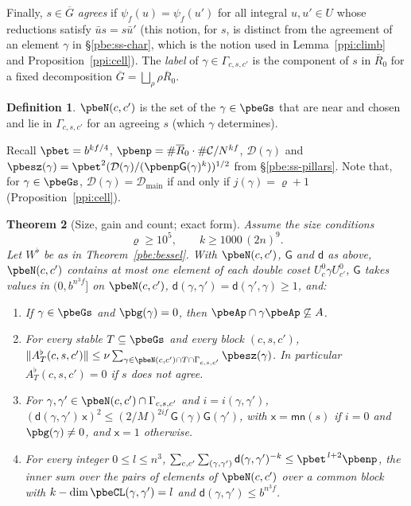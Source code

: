 \documentclass[10pt]{amsart}
\newtheorem{theorem}{Theorem}[section]
\theoremstyle{definition}
\newtheorem{definition}[theorem]{Definition}
\theoremstyle{remark}
\providecommand{\auG}{\overline G}
\providecommand{\pbDmain}{\mathcal D_{\mathrm{main}}}
\providecommand{\pbR}{\overline R_0}
\begin{document}
Finally, $s\in\auG$ \emph{agrees} if $\psi_f(u)=\psi_f(u')$ for all integral $u,u'\in U$ whose
reductions satisfy $\bar us=s\bar u'$ (this notion, for $s$, is distinct from the agreement of an element $\gamma$ in \S\ref{pbe:ss-char}, which is the notion used in Lemma~\ref{ppi:climb} and Proposition~\ref{ppi:cell}). The \emph{label} of $\gamma\in\Gamma_{c,s,c'}$ is the component of $s$
in $\pbR$ for a fixed decomposition $\auG=\bigsqcup_\rho\rho\pbR$.

\begin{definition}\label{ppi:def-N}
$\pbeN(c,c')$ is the set of the $\gamma\in\pbeGs$ that are near and chosen and lie in
$\Gamma_{c,s,c'}$ for an agreeing $s$ (which $\gamma$ determines).
\end{definition}

Recall $\pbet=b^{kf/4}$, $\pbenp=\#\pbR\cdot\#\mathcal C/N^{kf}$, $\mathcal D(\gamma)$ and
$\pbesz(\gamma)=\pbet^2(\mathcal D(\gamma)/(\pbenp\mathsf G(\gamma)^k))^{1/2}$ from
\S\ref{pbe:ss-pillars}. Note that, for $\gamma\in\pbeGs$, $\mathcal D(\gamma)=\pbDmain$ if and only if $j(\gamma)=\varrho+1$ (Proposition~\ref{ppi:cell}).

\begin{theorem}[Size, gain and count; exact form]\label{ppi:pillars}
Assume the size conditions
\begin{equation}\label{ppi:eq-sizes}
\varrho\ge10^5,\qquad k\ge1000\,(2n)^9 .
\end{equation}
Let $W^\flat$ be as in Theorem~\ref{pbe:bessel}. With $\pbeN(c,c')$, $\mathsf G$ and $\mathsf d$ as
above, $\pbeN(c,c')$ contains at most one element of each double coset $U_c^0\gamma U_{c'}^0$,
$\mathsf G$ takes values in $(0,b^{n^3f}]$ on $\pbeN(c,c')$, $\mathsf d(\gamma,\gamma')=\mathsf d(\gamma',
\gamma)\ge1$, and:
\begin{enumerate}
\item[(R)] If $\gamma\in\pbeGs$ and $\pbg(\gamma)=0$, then $\pbeAp\cap\gamma\pbeAp\not\subseteq A$.
\item[(S)] For every stable $T\subseteq\pbeGs$ and every block $(c,s,c')$, $\|A^\flat_T(c,s,c')\|\le
\nu\sum_{\gamma\in\pbeN(c,c')\cap T\cap\Gamma_{c,s,c'}}\pbesz(\gamma)$. In particular $A^\flat_T(c,s,
c')=0$ if $s$ does not agree.
\item[(G)] For $\gamma,\gamma'\in\pbeN(c,c')\cap\Gamma_{c,s,c'}$ and $i=i(\gamma,\gamma')$,
$(\mathsf d(\gamma,\gamma')\,\mathsf x)^2\le(2/M)^{2if}\,\mathsf G(\gamma)\mathsf G(\gamma')$, with
$\mathsf x=\mathsf{mn}(s)$ if $i=0$ and $\pbg(\gamma)\ne0$, and $\mathsf x=1$ otherwise.
\item[(C)] For every integer $0\le l\le n^3$, $\sum_{c,c'}\sum_{(\gamma,\gamma')}\mathsf d(\gamma,
\gamma')^{-k}\le\pbet^{\,l+2}\pbenp$, the inner sum over the pairs of elements of $\pbeN(c,c')$ over a
common block with $k-\dim\pbeCL(\gamma,\gamma')=l$ and $\mathsf d(\gamma,\gamma')\le b^{n^3f}$.
\end{enumerate}
\end{theorem}
\end{document}
